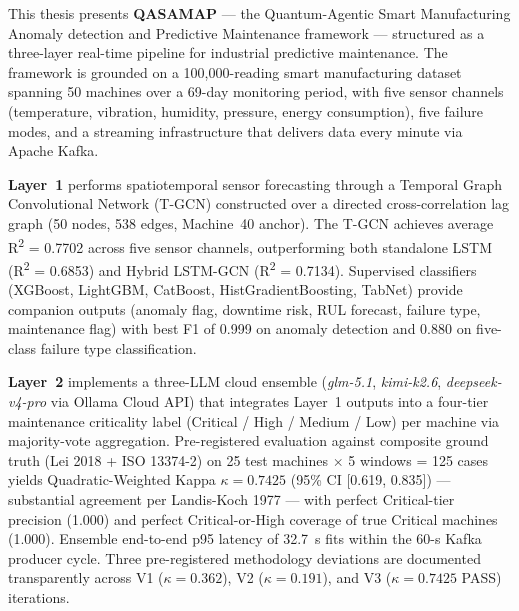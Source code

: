
\noindent
This thesis presents \textbf{QASAMAP} --- the Quantum-Agentic Smart Manufacturing Anomaly detection and Predictive Maintenance framework --- structured as a three-layer real-time pipeline for industrial predictive maintenance. The framework is grounded on a 100{,}000-reading smart manufacturing dataset spanning 50 machines over a 69-day monitoring period, with five sensor channels (temperature, vibration, humidity, pressure, energy consumption), five failure modes, and a streaming infrastructure that delivers data every minute via Apache Kafka.

\textbf{Layer~1} performs spatiotemporal sensor forecasting through a Temporal Graph Convolutional Network (T-GCN) constructed over a directed cross-correlation lag graph (50 nodes, 538 edges, Machine~40 anchor). The T-GCN achieves average R\textsuperscript{2} = 0.7702 across five sensor channels, outperforming both standalone LSTM (R\textsuperscript{2} = 0.6853) and Hybrid LSTM-GCN (R\textsuperscript{2} = 0.7134). Supervised classifiers (XGBoost, LightGBM, CatBoost, HistGradientBoosting, TabNet) provide companion outputs (anomaly flag, downtime risk, RUL forecast, failure type, maintenance flag) with best F1 of 0.999 on anomaly detection and 0.880 on five-class failure type classification.

\textbf{Layer~2} implements a three-LLM cloud ensemble (\textit{glm-5.1}, \textit{kimi-k2.6}, \textit{deepseek-v4-pro} via Ollama Cloud API) that integrates Layer~1 outputs into a four-tier maintenance criticality label (Critical / High / Medium / Low) per machine via majority-vote aggregation. Pre-registered evaluation against composite ground truth (Lei 2018 + ISO 13374-2) on 25 test machines $\times$ 5 windows = 125 cases yields Quadratic-Weighted Kappa $\kappa = 0.7425$ (95\% CI [0.619, 0.835]) --- substantial agreement per Landis-Koch 1977 --- with perfect Critical-tier precision (1.000) and perfect Critical-or-High coverage of true Critical machines (1.000). Ensemble end-to-end p95 latency of 32.7~s fits within the 60-s Kafka producer cycle. Three pre-registered methodology deviations are documented transparently across V1 ($\kappa = 0.362$), V2 ($\kappa = 0.191$), and V3 ($\kappa = 0.7425$ PASS) iterations.

